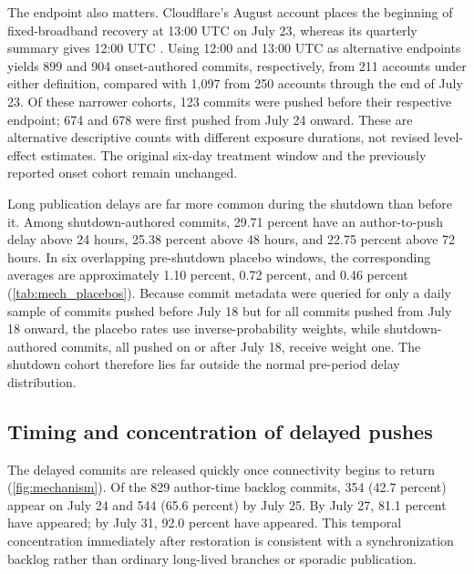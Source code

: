 The endpoint also matters. Cloudflare's August account places the beginning of fixed-broadband recovery at 13:00 UTC on July 23, whereas its quarterly summary gives 12:00 UTC \citep{belson2024,belson2024q3}. Using 12:00 and 13:00 UTC as alternative endpoints yields 899 and 904 onset-authored commits, respectively, from 211 accounts under either definition, compared with 1,097 from 250 accounts through the end of July 23. Of these narrower cohorts, 123 commits were pushed before their respective endpoint; 674 and 678 were first pushed from July 24 onward. These are alternative descriptive counts with different exposure durations, not revised level-effect estimates. The original six-day treatment window and the previously reported onset cohort remain unchanged.

Long publication delays are far more common during the shutdown than before it. Among shutdown-authored commits, 29.71 percent have an author-to-push delay above 24 hours, 25.38 percent above 48 hours, and 22.75 percent above 72 hours. In six overlapping pre-shutdown placebo windows, the corresponding averages are approximately 1.10 percent, 0.72 percent, and 0.46 percent (\cref{tab:mech_placebos}). Because commit metadata were queried for only a daily sample of commits pushed before July 18 but for all commits pushed from July 18 onward, the placebo rates use inverse-probability weights, while shutdown-authored commits, all pushed on or after July 18, receive weight one. The shutdown cohort therefore lies far outside the normal pre-period delay distribution.



\subsection{Timing and concentration of delayed pushes}
\label{sec:timing}

The delayed commits are released quickly once connectivity begins to return (\cref{fig:mechanism}). Of the 829 author-time backlog commits, 354 (42.7 percent) appear on July 24 and 544 (65.6 percent) by July 25. By July 27, 81.1 percent have appeared; by July 31, 92.0 percent have appeared. This temporal concentration immediately after restoration is consistent with a synchronization backlog rather than ordinary long-lived branches or sporadic publication.

